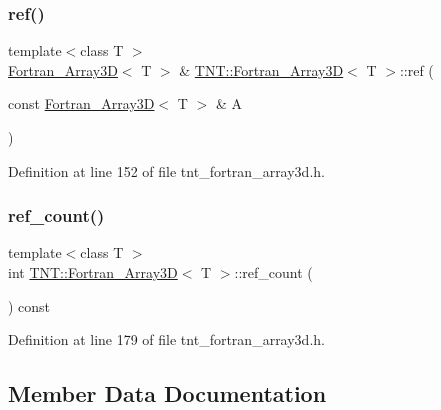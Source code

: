 \subsubsection{\texorpdfstring{ref()}{ref()}}
{\footnotesize\ttfamily template$<$class T $>$ \\
\hyperlink{classTNT_1_1Fortran__Array3D}{Fortran\+\_\+\+Array3D}$<$ T $>$ \& \hyperlink{classTNT_1_1Fortran__Array3D}{T\+N\+T\+::\+Fortran\+\_\+\+Array3D}$<$ T $>$\+::ref (\begin{DoxyParamCaption}\item[{const \hyperlink{classTNT_1_1Fortran__Array3D}{Fortran\+\_\+\+Array3D}$<$ T $>$ \&}]{A }\end{DoxyParamCaption})\hspace{0.3cm}{\ttfamily [inline]}}



Definition at line 152 of file tnt\+\_\+fortran\+\_\+array3d.\+h.

\mbox{\label{classTNT_1_1Fortran__Array3D_a41a34fa9c1f35ac86273648bc8c9496f}} 
\subsubsection{\texorpdfstring{ref\+\_\+count()}{ref\_count()}}
{\footnotesize\ttfamily template$<$class T $>$ \\
int \hyperlink{classTNT_1_1Fortran__Array3D}{T\+N\+T\+::\+Fortran\+\_\+\+Array3D}$<$ T $>$\+::ref\+\_\+count (\begin{DoxyParamCaption}{ }\end{DoxyParamCaption}) const\hspace{0.3cm}{\ttfamily [inline]}}



Definition at line 179 of file tnt\+\_\+fortran\+\_\+array3d.\+h.



\subsection{Member Data Documentation}
\mbox{\label{classTNT_1_1Fortran__Array3D_a1f4ad51040b91887d61f043cd1bf8b90}} 
